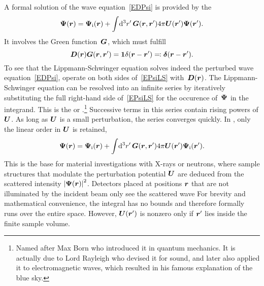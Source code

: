 A formal solution of the wave equation~\cref{EDPsi} is provided
by the 
%
\begin{equation}\label{EPsiLS}
  \bm{\Psi}(\bm{r})
  = \bm{\Psi}_{\text{i}}(\bm{r})
  + \int\!\mathrm d^3r'\, \bm{G}(\bm{r},\bm{r}') 4\pi\bm{U}(\bm{r}')\bm{\Psi}(\bm{r}').
\end{equation}
It involves the Green function~$\bm{G}$,
%
%
which must fulfill
\begin{equation}\label{EGREEN}
  \bm{D}(\bm{r})\bm{\bm{G}}(\bm{r},\bm{r}') = \bm{1} \delta(\bm{r}-\bm{r}') \eqqcolon \bm{\delta}(\bm{r}-\bm{r}').
\end{equation}
To see that the Lippmann-Schwinger equation solves indeed the perturbed wave equation~\cref{EDPsi},
operate on both sides of~\cref{EPsiLS} with~$\bm{D}(\bm{r})$.
The Lippmann-Schwinger equation can be resolved into an infinite series
by iteratively substituting the full right-hand side of~\cref{EPsiLS}
for the occurence of~$\bm{\Psi}$ in the integrand.
%
%
This is the  or .\footnote
{Named after Max Born who introduced it in quantum mechanics.
It is actually due to Lord Rayleigh who devised it for sound,
and later also applied it to electromagnetic waves,
which resulted in his famous explanation of the blue sky.}
Successive terms in this series contain rising powers of $\bm{U}$.
As long as $\bm{U}$ is a small perturbation, the series converges quickly.
In ,
%
only the linear order in $\bm{U}$ is retained,
\begin{equation}\label{EBorn}
  \bm{\Psi}(\bm{r})
  = \bm{\Psi}_{\text{i}}(\bm{r})
  + \int\!\mathrm d^3r'\, \bm{G}(\bm{r},\bm{r}') 4\pi\bm{U}(\bm{r}')\bm{\Psi}_{\text{i}}(\bm{r}').
\end{equation}
This is the base for material investigations with X-rays or neutrons,
where sample structures that modulate the perturbation potential $\bm{U}$
are deduced from the scattered intensity ${|\bm{\Psi}(\bm{r})|}^2$.
Detectors placed at positions $\bm{r}$
that are not illuminated by the incident beam
only see the scattered wave
%
%
%
%
For brevity and mathematical convenience,
the integral has no bounds
and therefore formally runs over the entire space.
However, $\bm{U}(\bm{r}')$ is nonzero only if $\bm{r}'$ lies inside the finite sample volume.

